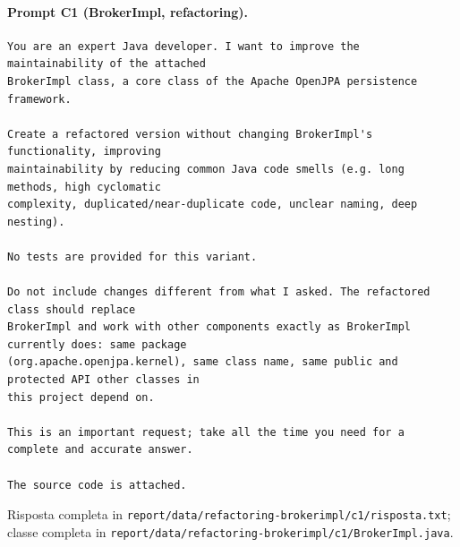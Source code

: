 \paragraph*{Prompt C1 (BrokerImpl, refactoring).}
\label{prompt:refactor-c1}
\begin{lstlisting}
You are an expert Java developer. I want to improve the maintainability of the attached
BrokerImpl class, a core class of the Apache OpenJPA persistence framework.

Create a refactored version without changing BrokerImpl's functionality, improving
maintainability by reducing common Java code smells (e.g. long methods, high cyclomatic
complexity, duplicated/near-duplicate code, unclear naming, deep nesting).

No tests are provided for this variant.

Do not include changes different from what I asked. The refactored class should replace
BrokerImpl and work with other components exactly as BrokerImpl currently does: same package
(org.apache.openjpa.kernel), same class name, same public and protected API other classes in
this project depend on.

This is an important request; take all the time you need for a complete and accurate answer.

The source code is attached.
\end{lstlisting}
Risposta completa in \texttt{report/data/refactoring-brokerimpl/c1/risposta.txt}; classe
completa in \texttt{report/data/refactoring-brokerimpl/c1/BrokerImpl.java}.

